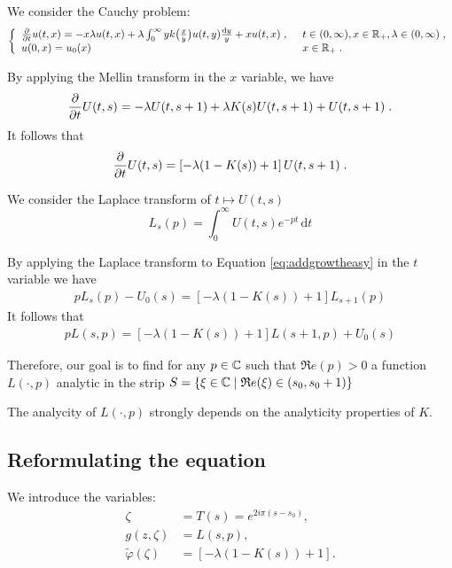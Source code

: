 \documentclass[11pt]{amsart}
\renewcommand{\Re}{\mathfrak{R}e}
\newcommand{\diff}{\,\mathrm{d}}
\begin{document}
We consider the Cauchy problem:
\begin{equation*}\left\{
    \begin{array}{ll}
	\frac{\partial}{\partial t}u(t,x) = - x\lambda u(t,x) + \lambda \int_{0}^{\infty} y k\big( \frac{x}{y}\big) u(t,y) \frac{\mathrm dy}{y} + xu(t,x)
	\; , \enspace
	& t \in (0, \infty), x \in \mathbb{R}_+, \lambda \in (0, \infty) \; ,
	\\
	u(0, x) = u_0(x)
	& x \in \mathbb{R}_+
	\; .
    \end{array}
	\right.
\end{equation*}

By applying the Mellin transform in the $x$ variable, we have
	\begin{equation*}
		\frac{\partial}{\partial t} U(t,s) = - \lambda U(t,s+1) + \lambda K(s) U(t,s+1) + U(t,s+1)
		\; .
	\end{equation*}
It follows that
    \begin{equation}
        \frac{\partial}{\partial t} U(t,s) = \left[- \lambda (1-K(s)) + 1\right] U(t,s+1)
		\; .
        \label{eq:addgrowtheasy}
    \end{equation}

We consider the Laplace transform of $t \mapsto U(t,s)$
$$ L_s(p) = \int_0^\infty U(t,s)e^{-pt}\diff t$$ 

By applying the Laplace transform to Equation \eqref{eq:addgrowtheasy} in the $t$ variable we have 
\begin{align*}
    pL_s(p) - U_0(s) = \left[- \lambda (1-K(s)) + 1\right] L_{s+1}(p)
\end{align*}
It follows that 
\begin{align}
    \label{eq:wienerhopfeq}
    pL(s,p) = \left[- \lambda (1-K(s)) + 1\right] L(s+1,p) + U_0(s)
\end{align} 

\medskip

Therefore, our goal is to find for any $p \in \mathbb{C}$ such that $\Re(p) > 0$ a function $L(\cdot,p)$ analytic in the strip $S = \{\xi \in \CC \mid \Re(\xi) \in (s_0, s_0+1)\}$

\medskip

The analycity of $L(\cdot,p)$ strongly depends on the analyticity properties of $K$.

\subsection{Reformulating the equation}

We introduce the variables:
    \begin{align}
        \zeta &= T(s) = e^{2i\pi(s-s_0)},\\
        g(z,\zeta) &= L(s,p), \\
        \tilde \varphi(\zeta) &= \left[- \lambda (1-K(s)) + 1\right].
    \end{align}
\end{document}

